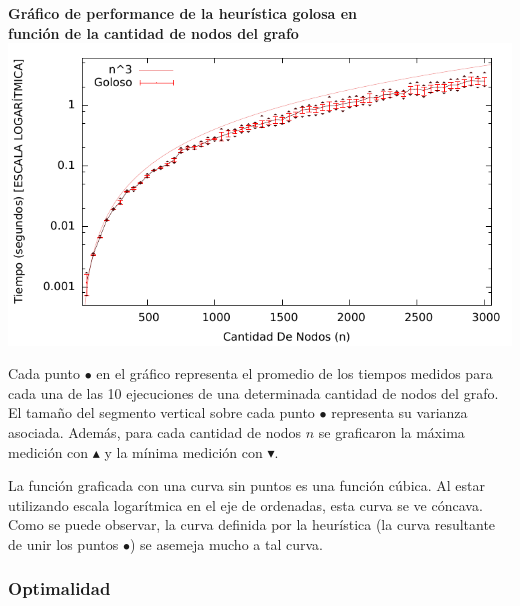 \begin{center}
\textbf{Gráfico de performance de la heurística golosa en\\función de la cantidad
de nodos del grafo}
\includegraphics[scale=1.3]{imgs/goloso_3000_50_10.pdf}
\end{center}

\par{Cada punto $\bullet$ en el gráfico representa el promedio de los tiempos
medidos para cada una de las 10 ejecuciones de una determinada cantidad de nodos
del grafo. El tamaño del segmento vertical sobre cada punto $\bullet$ representa
su varianza asociada. Además, para cada cantidad de nodos $n$ se graficaron la
máxima medición con $\blacktriangle$ y la mínima medición con
$\blacktriangledown$.}\\

\par{La función graficada con una curva sin puntos es una función cúbica. Al
estar utilizando escala logarítmica en el eje de ordenadas, esta curva
se ve cóncava. Como se puede observar, la curva definida por la heurística
(la curva resultante de unir los puntos $\bullet$) se asemeja mucho a tal
curva.}

\subsubsection{Optimalidad}

